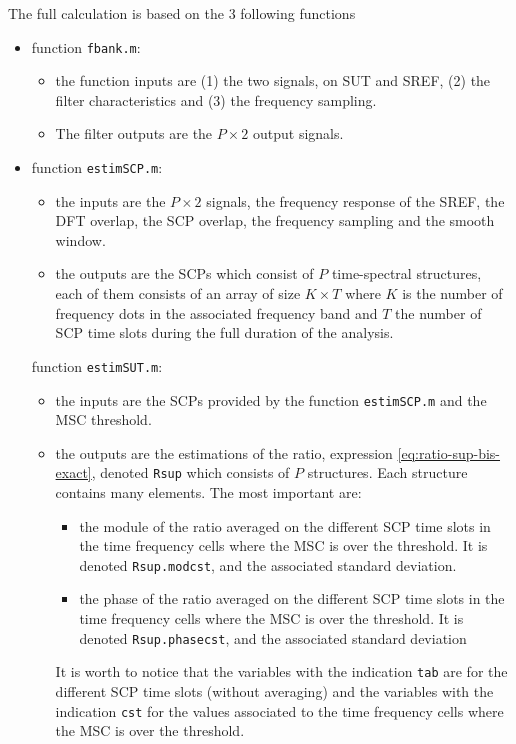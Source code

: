 The full calculation is based on the 3 following functions
\begin{itemize}
\item 
function {\tt fbank.m}: 
\begin{itemize}
\item
the function inputs are (1) the two signals, on SUT and SREF, (2) the filter characteristics and (3) the frequency sampling.
\item
The filter outputs are the $P\times 2$ output signals.
\end{itemize}
\item  
function {\tt estimSCP.m}: 
\begin{itemize}
\item
the inputs are the $P\times 2$ signals, the frequency response of the SREF, 
the DFT overlap, the SCP overlap, the frequency sampling and the smooth window. 

\item
the outputs are the SCPs which consist of $P$ time-spectral structures, each of them consists of an array of size $K \times T$ where $K$ is the number of frequency dots in the associated frequency band and $T$ the number of SCP time slots during the full duration of the analysis.
\end{itemize}

function {\tt estimSUT.m}: 
\begin{itemize}
\item
the inputs are the SCPs provided by the function {\tt estimSCP.m} and the MSC threshold.

\item
the outputs are the estimations of the ratio, expression \eqref{eq:ratio-sup-bis-exact}, denoted {\tt Rsup} which consists of $P$ structures. Each structure contains many elements. The most important are: 
\begin{itemize}
\item
the module of the ratio averaged on the different SCP time slots in the time frequency cells where the MSC is over the threshold.
It is denoted {\tt Rsup.modcst}, and the associated standard deviation.
\item
 the phase of the ratio averaged on the different SCP time slots in the time frequency cells where the MSC is over the threshold.
It is denoted {\tt Rsup.phasecst}, and the associated standard deviation
\end{itemize}
It is worth to notice that the variables with the indication {\tt tab} are for the different SCP time slots (without averaging) and the variables with the indication {\tt cst} for the values associated to the time frequency cells where the MSC is over the threshold.

\end{itemize}

\end{itemize}




